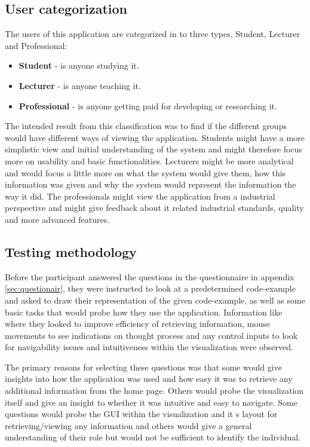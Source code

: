 \subsection{User categorization}
The users of this application are categorized in to three types, Student, Lecturer and Professional: 
\begin{itemize}
    \item \textbf{Student} - is anyone studying \gls{it}. 
    \item \textbf{Lecturer} - is anyone teaching \gls{it}. 
    \item \textbf{Professional} - is anyone getting paid for developing or researching \gls{it}.
\end{itemize}

The intended result from this classification was to find if the different groups would have different ways of viewing the application. Students might have a more simplistic view and initial understanding of the system and might therefore focus more on usability and basic functionalities. Lecturers might be more analytical and would focus a little more on what the system would give them, how this information was given and why the system would represent the information the way it did. The professionals might view the application from a industrial perspective and might give feedback about \gls{it} related industrial standards, quality and more advanced features.

\subsection{Testing methodology}
Before the participant answered the questions in the questionnaire in appendix \ref{sec:questionair}, they were instructed to look at a  predetermined code-example and asked to draw their representation of the given code-example, as well as some basic tasks that would probe how they use the application. Information like where they looked to improve efficiency of retrieving information, mouse movements to see indications on thought process and any control inputs to look for navigability issues and intuitiveness within the visualization were observed.

The primary reasons for selecting these questions was that some would give insights into how the application was used and how easy it was to retrieve any additional information from the home page. Others would probe the visualization itself and give an insight to whether it was intuitive and easy to navigate. Some questions would probe the GUI within the visualization and it s layout for retrieving/viewing any information and others would give a general understanding of their role but would not be sufficient to identify the individual.


